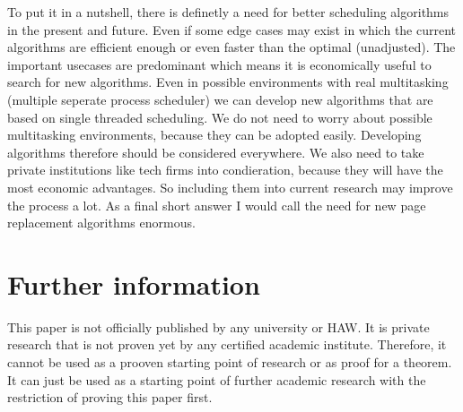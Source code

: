 \documentclass[12pt, reqno]{amsart}
\numberwithin{equation}{section}
\begin{document}
To put it in a nutshell, there is definetly a need for better scheduling algorithms in the present and future. Even if some edge cases may exist in which the current algorithms are efficient enough or even faster than the optimal (unadjusted). 
The important usecases are predominant which means it is economically useful to search for new algorithms. Even in possible environments with real multitasking (multiple seperate process scheduler)
we can develop new algorithms that are based on single threaded scheduling. We do not need to worry about possible multitasking environments, because they can be adopted easily. Developing algorithms therefore should be considered everywhere.
We also need to take private institutions like tech firms into condieration, because they will have the most economic advantages. So including them into current research may improve the 
process a lot. As a final short answer I would call the need for new page replacement algorithms enormous. 

\section{Further information}

This paper is not officially published by any university or HAW. It is private research that is not proven yet by any certified academic institute. Therefore, it cannot be used 
as a prooven starting point of research or as proof for a theorem. It can just be used as a starting point of further academic research with the restriction of proving this paper first.
\end{document}
